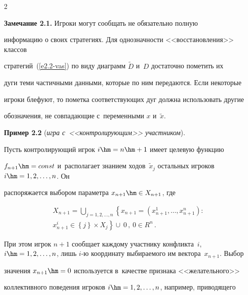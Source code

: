 \begin{multicols}{2}
\vspace*{6pt}









    \noindent

    \textbf{Замечание 2.1.} Игроки могут сообщать не обязательно полную

информацию о своих стратегиях. Для однозначности <<восстановления>> классов

стратегий~(\ref{e2.2-vas}) по виду диаграмм $\tilde{D}$ и~$D$ достаточно пометить их

дуги теми частичными данными, которые по ним передаются. Если некоторые

игроки блефуют, то пометка соответствующих дуг должна использовать другие

обозначения, не совпадающие с~переменными $x$ и~$\tilde{x}$.



    \smallskip



    \noindent

    \textbf{Пример 2.2} (\textit{игра с~<<контролирующим>> участником}).

Пусть контролирующий игрок $i\hm= n\hm+1$ имеет целевую функцию

$f_{n+1}\hm= const$ и~располагает знанием ходов~$\tilde{x}_j$ остальных игроков $i\hm= 1,2,\ldots, n$. Он

распоряжается выбором параметра $x_{n+1}\hm\in X_{n+1}$, где

    \begin{multline*}

    X_{n+1} =\mathop{\bigcup}\limits_{j=1,2,\ldots, n} \left\{ x_{n+1} =\left( x^1_{n+1},\ldots ,

x^n_{n+1}\right):\right.\\

\left. x^i_{n+1}\in \left\{ j\right\} \times X_j\right\} \cup\ 0\,,\ 0\in R^n\,.

    \end{multline*}

При этом игрок $n+1$ сообщает каждому участнику конфликта~$i$, $i\hm=

1,2,\ldots, n$, лишь $i$-ю координату выбираемого им вектора~$x_{n+1}$. Выбор

значения $x_{n+1}\hm=0$ используется в~качестве признака <<желательного>>

коллективного поведения игроков $i\hm=1,2,\ldots, n$, например, приводящего


\end{multicols}
